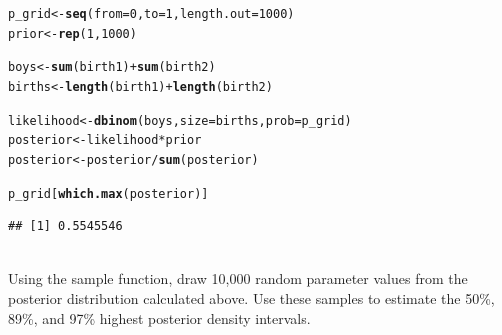 \documentclass[12pt]{article}\usepackage[]{graphicx}\usepackage[]{color}
\makeatletter
\newcommand{\hlnum}[1]{\textcolor[rgb]{0.686,0.059,0.569}{#1}}%
\newcommand{\hlopt}[1]{\textcolor[rgb]{0,0,0}{#1}}%
\newcommand{\hlstd}[1]{\textcolor[rgb]{0.345,0.345,0.345}{#1}}%
\newcommand{\hlkwb}[1]{\textcolor[rgb]{0.69,0.353,0.396}{#1}}%
\newcommand{\hlkwc}[1]{\textcolor[rgb]{0.333,0.667,0.333}{#1}}%
\newcommand{\hlkwd}[1]{\textcolor[rgb]{0.737,0.353,0.396}{\textbf{#1}}}%
\newenvironment{kframe}{%
 \def\at@end@of@kframe{}%
 \ifinner\ifhmode%
  \def\at@end@of@kframe{\end{minipage}}%
  \begin{minipage}{\columnwidth}%
 \fi\fi%
 \def\FrameCommand##1{\hskip\@totalleftmargin \hskip-\fboxsep
 \colorbox{shadecolor}{##1}\hskip-\fboxsep
     \hskip-\linewidth \hskip-\@totalleftmargin \hskip\columnwidth}%
 \MakeFramed {\advance\hsize-\width
   \@totalleftmargin\z@ \linewidth\hsize
   \@setminipage}}%
 {\par\unskip\endMakeFramed%
 \at@end@of@kframe}
\newenvironment{knitrout}{}{} %
\newenvironment{problem}[2][Problem]{\begin{trivlist}
\item[\hskip \labelsep {\bfseries #1}\hskip \labelsep {\bfseries #2.}]}{\end{trivlist}}
\makeatother
\begin{document}
\begin{knitrout}
\color{fgcolor}\begin{kframe}
\begin{alltt}
\hlstd{p_grid} \hlkwb{<-} \hlkwd{seq}\hlstd{(}\hlkwc{from} \hlstd{=} \hlnum{0}\hlstd{,} \hlkwc{to} \hlstd{=} \hlnum{1}\hlstd{,} \hlkwc{length.out} \hlstd{=} \hlnum{1000}\hlstd{)}
\hlstd{prior} \hlkwb{<-} \hlkwd{rep}\hlstd{(}\hlnum{1}\hlstd{,} \hlnum{1000}\hlstd{)}

\hlstd{boys} \hlkwb{<-} \hlkwd{sum}\hlstd{(birth1)} \hlopt{+} \hlkwd{sum}\hlstd{(birth2)}
\hlstd{births} \hlkwb{<-} \hlkwd{length}\hlstd{(birth1)} \hlopt{+} \hlkwd{length}\hlstd{(birth2)}

\hlstd{likelihood} \hlkwb{<-} \hlkwd{dbinom}\hlstd{(boys,} \hlkwc{size} \hlstd{= births,} \hlkwc{prob} \hlstd{= p_grid)}
\hlstd{posterior} \hlkwb{<-} \hlstd{likelihood}\hlopt{*}\hlstd{prior}
\hlstd{posterior} \hlkwb{<-} \hlstd{posterior} \hlopt{/} \hlkwd{sum}\hlstd{(posterior)}

\hlstd{p_grid[}\hlkwd{which.max}\hlstd{(posterior)]}
\end{alltt}
\begin{verbatim}
## [1] 0.5545546
\end{verbatim}
\end{kframe}
\end{knitrout}

\begin{problem}{3H2}
\text{}\\
Using the sample function, draw 10,000 random parameter values from the posterior distribution calculated above. Use these samples to estimate the 50\%, 89\%, and 97\% highest posterior density intervals.
\end{problem}
\end{document}
